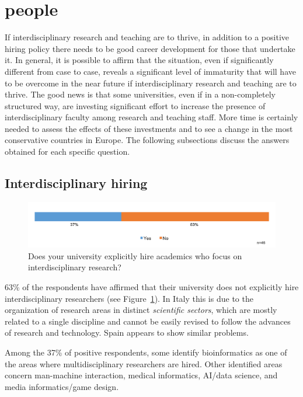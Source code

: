 \newpage
\section{people}

If interdisciplinary research and teaching are to thrive, in addition to a positive hiring policy there needs to be good career development for those that undertake it.
 In general, it is possible to affirm that the situation,
even if significantly different from case to case, reveals a
significant level of immaturity that will have to be overcome in the
near future if interdisciplinary research and teaching are to thrive. The good news is that some universities, even if in
a non-completely structured way, are investing significant effort to
increase the presence of interdisciplinary faculty among research and
teaching staff. More time is certainly needed to assess the
effects of these investments and to see a change in the most
conservative countries in Europe. The 
following subsections discuss the answers obtained for each specific
question.

\subsection{Interdisciplinary hiring}\label{sec:hiring}

\begin{figure}[h]
\centering
\includegraphics[width = \linewidth]{charts/3a.png}
\caption{Does your university explicitly hire academics
  who focus on interdisciplinary research?}
\label{sect3:hirings}
\end{figure}

63\% of the respondents have affirmed that their university does not
explicitly hire interdisciplinary researchers (see Figure~\ref{sect3:hirings}). In Italy this is 
due to the organization of research areas in distinct \emph{scientific
  sectors}, which are mostly related to a single discipline and cannot be easily revised to follow the advances of
research and technology. Spain appears to show similar problems.

Among the 37\% of positive respondents, some identify bioinformatics
as one of the areas where multidisciplinary researchers are hired. 
Other identified areas concern man-machine interaction, medical
informatics, AI/data science, and media informatics/game design.

